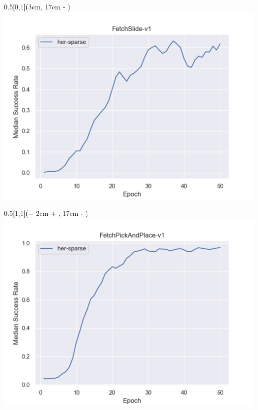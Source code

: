 \begin{frame}
	\begin{textblock*}{0.5\paperwidth}[0,1](3cm, 17cm - \PraesentationSeitenrand)%
		\includegraphics[width=0.3\paperwidth]{./Ressourcen/Figures/fig_FetchSlide-v1.pdf}
	\end{textblock*}
	
	\begin{textblock*}{0.5\paperwidth}[1,1](\textwidth + 2cm + \PraesentationSeitenrand, 17cm - \PraesentationSeitenrand)%
		\includegraphics[width=0.3\paperwidth]{./Ressourcen/Figures/fig_FetchPickAndPlace-v1.pdf}
	\end{textblock*}
	
	
	
\end{frame}
\clearpage

